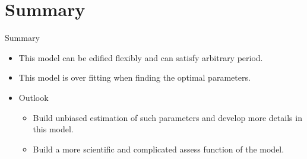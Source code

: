 \documentclass{beamer}
\begin{document}
\section*{Summary}

\begin{frame}{Summary}
  \begin{itemize}
  \item
    This model can be edified flexibly and can satisfy arbitrary period.
    \pause
  \item
    This model is over fitting when finding the optimal parameters.
    \pause
  \end{itemize}
  \begin{itemize}
  \item
    Outlook
    \pause
    \begin{itemize}
    \item
      Build unbiased estimation of such parameters and develop more details in this model.
      \pause
    \item
      Build a more scientific and complicated assess function of the model.
      \pause
    \end{itemize}
  \end{itemize}
\end{frame}
\end{document}
